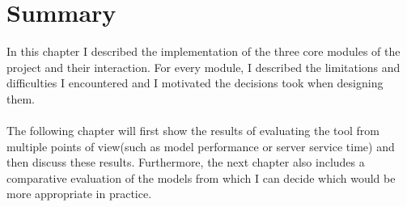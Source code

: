 	\section{Summary} \label{Section: impl/summary}
	In this chapter I described the implementation of the three core modules of the project and their interaction. For every module, I described the limitations and difficulties I encountered and I motivated the decisions took when designing them. 
	\\ \\
	The following chapter will first show the results of evaluating the tool from multiple points of view(such as model performance or server service time) and then discuss these results. Furthermore, the next chapter also includes a comparative evaluation of the models from which I can decide which would be more appropriate in practice. 
